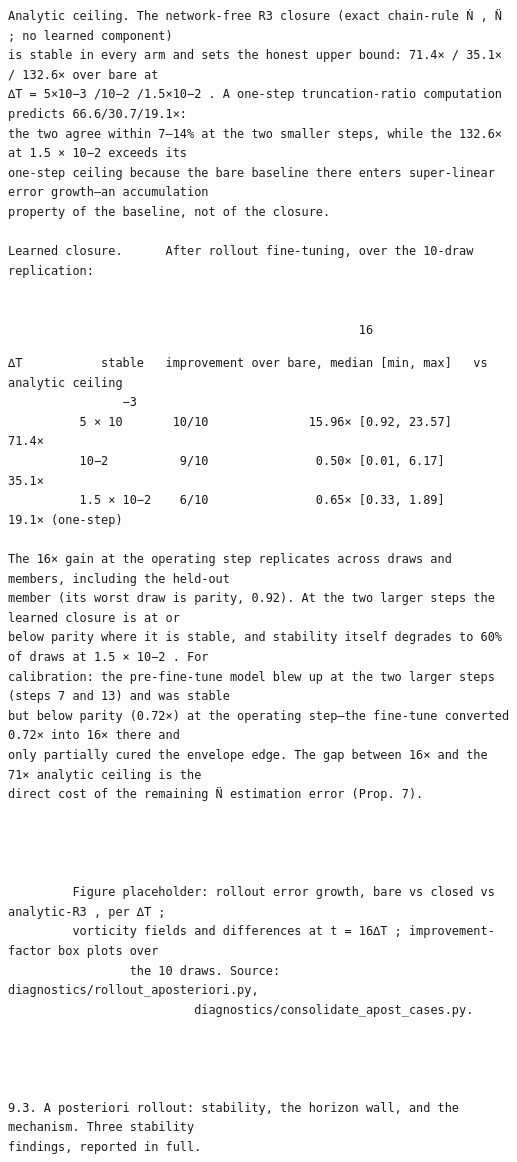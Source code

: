 \documentclass[letterpaper]{article}
\begin{document}
\begin{Verbatim}[fontsize=\fontsize{6.35}{7.15}\selectfont,breaklines=false]
Analytic ceiling. The network-free R3 closure (exact chain-rule Ṅ , N̈ ; no learned component)
is stable in every arm and sets the honest upper bound: 71.4× / 35.1× / 132.6× over bare at
∆T = 5×10−3 /10−2 /1.5×10−2 . A one-step truncation-ratio computation predicts 66.6/30.7/19.1×:
the two agree within 7–14% at the two smaller steps, while the 132.6× at 1.5 × 10−2 exceeds its
one-step ceiling because the bare baseline there enters super-linear error growth—an accumulation
property of the baseline, not of the closure.

Learned closure.      After rollout fine-tuning, over the 10-draw replication:


                                                 16
\end{Verbatim}
\newpage
\begin{Verbatim}[fontsize=\fontsize{6.35}{7.15}\selectfont,breaklines=false]
          ∆T           stable   improvement over bare, median [min, max]   vs analytic ceiling
                −3
          5 × 10       10/10              15.96× [0.92, 23.57]                  71.4×
          10−2          9/10               0.50× [0.01, 6.17]                   35.1×
          1.5 × 10−2    6/10               0.65× [0.33, 1.89]              19.1× (one-step)

The 16× gain at the operating step replicates across draws and members, including the held-out
member (its worst draw is parity, 0.92). At the two larger steps the learned closure is at or
below parity where it is stable, and stability itself degrades to 60% of draws at 1.5 × 10−2 . For
calibration: the pre-fine-tune model blew up at the two larger steps (steps 7 and 13) and was stable
but below parity (0.72×) at the operating step—the fine-tune converted 0.72× into 16× there and
only partially cured the envelope edge. The gap between 16× and the 71× analytic ceiling is the
direct cost of the remaining N̈ estimation error (Prop. 7).




         Figure placeholder: rollout error growth, bare vs closed vs analytic-R3 , per ∆T ;
         vorticity fields and differences at t = 16∆T ; improvement-factor box plots over
                 the 10 draws. Source: diagnostics/rollout_aposteriori.py,
                          diagnostics/consolidate_apost_cases.py.




9.3. A posteriori rollout: stability, the horizon wall, and the mechanism. Three stability
findings, reported in full.


\end{Verbatim}
\end{document}
